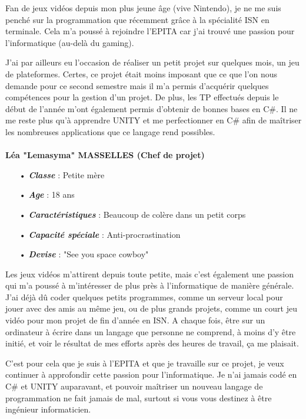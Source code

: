 \documentclass{article}
\begin{document}
Fan de jeux vidéos depuis mon plus jeune âge (vive Nintendo), je ne me suis penché sur la programmation que récemment grâce à la spécialité ISN en terminale. Cela m'a poussé à rejoindre l'EPITA car j'ai trouvé une passion pour l'informatique (au-delà du gaming).

J'ai par ailleurs eu l'occasion de réaliser un petit projet sur quelques mois, un jeu de plateformes. Certes, ce projet était moins imposant que ce que l'on nous demande pour ce 
second semestre mais il m'a permis d'acquérir quelques compétences pour la gestion d'un projet. De plus, les TP effectués depuis le début de l'année m'ont également permis d'obtenir
de bonnes bases en C\#. Il ne me reste plus qu'à apprendre UNITY et me perfectionner en C\# afin de maîtriser les nombreuses applications que ce langage rend possibles.\\
\\
\vspace{0.3cm}
\textbf{Léa "Lemasyma" MASSELLES (Chef de projet)}
\begin{itemize}
\item[•] \textbf{\textit{Classe}} : Petite mère
\item[•] \textbf{\textit{Age}} : 18 ans
\item[•] \textbf{\textit{Caractéristiques}} : Beaucoup de colère dans un petit corps
\item[•] \textbf{\textit{Capacité spéciale}} : Anti-procrastination
\item[•] \textbf{\textit{Devise}} : "See you space cowboy"
\end{itemize}


Les jeux vidéos m'attirent depuis toute petite, mais c'est également une passion qui m'a poussé à m'intéresser de plus près à l'informatique de manière générale. J'ai déjà dû coder quelques petits programmes, comme un serveur local pour jouer avec des amis au même jeu, ou de plus grands projets, comme un court jeu vidéo pour mon projet de fin d'année en ISN. A chaque fois, être sur un ordinateur à écrire dans un langage que personne ne comprend, à moins d'y être initié, et voir le résultat de mes efforts après des heures de travail, ça me plaisait.


C'est pour cela que je suis à l'EPITA et que je travaille sur ce projet, je veux continuer à approfondir cette passion pour l'informatique. Je n'ai jamais codé en C\# et UNITY auparavant, et pouvoir maîtriser un nouveau langage de programmation ne fait jamais de mal, surtout si vous vous destinez à être ingénieur informaticien.
\end{document}
